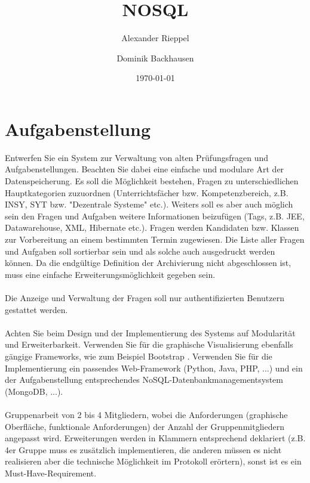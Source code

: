 \documentclass[a4paper,12pt]{scrreprt}
\begin{document}
\author{Alexander Rieppel \and Dominik Backhausen} %
\title{ NOSQL } %
\subject{VSDB} %
\date{\today} %
\publishers{5AHITT} %

\maketitle
\tableofcontents


\chapter{Aufgabenstellung}
Entwerfen Sie ein System zur Verwaltung von alten Prüfungsfragen und Aufgabenstellungen. Beachten Sie dabei eine einfache und modulare Art der Datenspeicherung. Es soll die Möglichkeit bestehen, Fragen zu unterschiedlichen Hauptkategorien zuzuordnen (Unterrichtsfächer bzw. Kompetenzbereich, z.B. INSY, SYT bzw. "Dezentrale Systeme" etc.). Weiters soll es aber auch möglich sein den Fragen und Aufgaben weitere Informationen beizufügen (Tags, z.B. JEE, Datawarehouse, XML, Hibernate etc.). Fragen werden Kandidaten bzw. Klassen zur Vorbereitung an einem bestimmten Termin zugewiesen. Die Liste aller Fragen und Aufgaben soll sortierbar sein und als solche auch ausgedruckt werden können. Da die endgültige Definition der Archivierung nicht abgeschlossen ist, muss eine einfache Erweiterungsmöglichkeit gegeben sein.\\\\Die Anzeige und Verwaltung der Fragen soll nur authentifizierten Benutzern gestattet werden.\\\\Achten Sie beim Design und der Implementierung des Systems auf Modularität und Erweiterbarkeit. Verwenden Sie für die graphische Visualisierung ebenfalls gängige Frameworks, wie zum Beispiel Bootstrap . Verwenden Sie für die Implementierung ein passendes Web-Framework (Python, Java, PHP, ...) und ein der Aufgabenstellung entsprechendes NoSQL-Datenbankmanagementsystem (MongoDB, ...).\\\\Gruppenarbeit von 2 bis 4 Mitgliedern, wobei die Anforderungen (graphische Oberfläche, funktionale Anforderungen) der Anzahl der Gruppenmitgliedern angepasst wird. Erweiterungen werden in Klammern entsprechend deklariert (z.B. 4er Gruppe muss es zusätzlich implementieren, die anderen müssen es nicht realisieren aber die technische Möglichkeit im Protokoll erörtern), sonst ist es ein Must-Have-Requirement.
\end{document}
